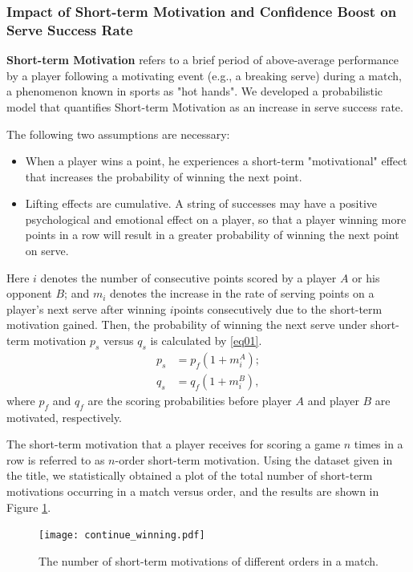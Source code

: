 \documentclass{mcmthesis}
\begin{document}
\subsubsection{Impact of Short-term Motivation and Confidence Boost on Serve Success Rate}
\textbf{Short-term Motivation} refers to a brief period of above-average performance by a player
following a motivating event (e.g., a breaking serve) during a match, a phenomenon known
in sports as "hot hands". We developed a probabilistic model that quantifies Short-term
Motivation as an increase in serve success rate.\par
The following two assumptions are necessary:
\begin{itemize}
  \item When a player wins a point, he experiences a short-term "motivational" effect that increases
  the probability of winning the next point.
  \item Lifting effects are cumulative. A string of successes may have a positive psychological
  and emotional effect on a player, so that a player winning more points in a row will result
  in a greater probability of winning the next point on serve.
\end{itemize}
Here $i$ denotes the number of consecutive points scored by a player $A$ or his opponent $B$;
and $m_i$ denotes the increase in the rate of serving points on a player’s next serve after winning
$i$points consecutively due to the short-term motivation gained. Then, the probability of winning
the next serve under short-term motivation $p_s$ versus $q_s$ is calculated by \eqref{eq01}.
\begin{equation}
  \begin{split}
    p_s &= p_f(1+m_i^A);\\
    q_s &= q_f(1+m_i^B),
  \end{split}
  \label{eq01}
\end{equation}
where $p_f$ and $q_f$ are the scoring probabilities before player $A$ and player $B$ are motivated,
respectively.\par
The short-term motivation that a player receives for scoring a game $n$ times in a row is
referred to as $n$-order short-term motivation. Using the dataset given in the title, we statistically
obtained a plot of the total number of short-term motivations occurring in a match versus order,
and the results are shown in Figure \ref{fig3}. \par
\begin{figure}[h]
  \centering
  \texttt{[image: continue\_winning.pdf]}
  \caption{The number of short-term motivations of different orders in a match.} \label{fig4}
  \label{fig3}
\end{figure}
\end{document}
